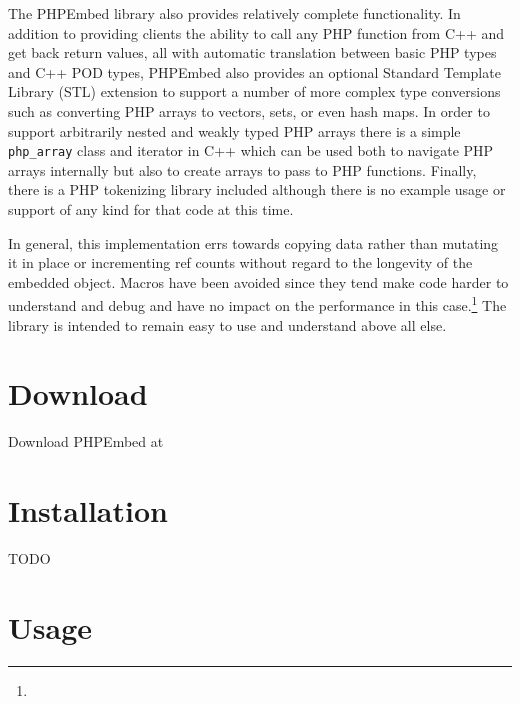 \documentclass[11pt,titlepage]{article}
\begin{document}
The PHPEmbed library also provides relatively complete functionality. In addition to providing clients the ability to call any PHP function from C++ and get back return values, all with automatic translation between basic PHP types and C++ POD types, PHPEmbed also provides an optional Standard Template Library (STL) extension to support a number of more complex type conversions such as converting PHP arrays to vectors, sets, or even hash maps. In order to support arbitrarily nested and weakly typed PHP arrays there is a simple \verb|php_array| class and iterator in C++ which can be used both to navigate PHP arrays internally but also to create arrays to pass to PHP functions. Finally, there is a PHP tokenizing library included although there is no example usage or support of any kind for that code at this time.

In general, this implementation errs towards copying data rather than mutating it in place or incrementing ref counts without regard to the longevity of the embedded object. Macros have been avoided since they tend make code harder to understand and debug and have no impact on the performance in this case.\footnote{} The library is intended to remain easy to use and understand above all else.

\section{Download}

Download PHPEmbed at 

\section{Installation}

TODO

\section{Usage}
\end{document}
